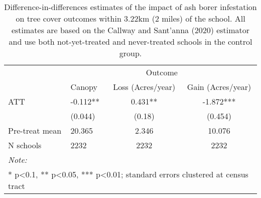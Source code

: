\begin{table}[!h]

\caption{\label{tab:school-tree-table}Difference-in-differences estimates of the impact of ash borer infestation on tree cover outcomes within 3.22km (2 miles) of the school. All estimates are based on the Callway and Sant'anna (2020) estimator and use both not-yet-treated and never-treated schools in the control group.}
\centering
\begin{tabular}[t]{llcc}
\toprule
\multicolumn{1}{c}{ } & \multicolumn{3}{c}{Outcome} \\
\cmidrule(l{3pt}r{3pt}){2-4}
  & Canopy & Loss (Acres/year) & Gain (Acres/year)\\
\midrule
ATT & -0.112** & 0.431** & -1.872***\\
 & (0.044) & (0.18) & (0.454)\\
\midrule
Pre-treat mean & 20.365 & 2.346 & 10.076\\
N schools & 2232 & 2232 & 2232\\
\bottomrule
\multicolumn{4}{l}{\rule{0pt}{1em}\textit{Note: }}\\
\multicolumn{4}{l}{\rule{0pt}{1em}* p<0.1, ** p<0.05, *** p<0.01; standard errors clustered at census tract}\\
\end{tabular}
\end{table}
